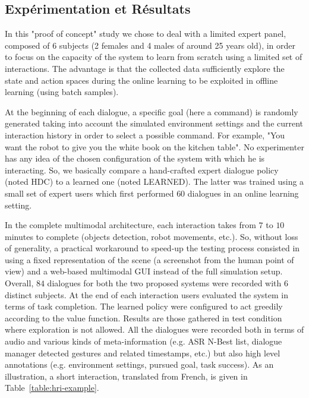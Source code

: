 \documentclass[a4paper,11pt,twoside]{StyleThese}
\begin{document}
\subsection{Expérimentation et Résultats}
In this "proof of concept" study we chose to deal with a limited expert panel, composed of 6 subjects (2 females and 4 males of around 25 years old), in order to focus on the capacity of the system to learn from scratch using a limited set of interactions. The advantage is that the collected data sufficiently explore the state and action spaces during the online learning to be exploited in offline learning (using batch samples).

At the beginning of each dialogue, a specific goal (here a command) is randomly generated taking into account the simulated environment settings and the current interaction history in order to select a possible command. For example, "You want the robot to give you the white book on the kitchen table". No experimenter has any idea of the chosen configuration of the system with which he is interacting. So, we basically compare a hand-crafted expert dialogue policy (noted HDC) to a learned one (noted LEARNED). The latter was trained using a small set of expert users which first performed $60$ dialogues in an online learning setting.

In the complete multimodal architecture, each interaction takes from $7$ to $10$ minutes to complete (objects detection, robot movements, etc.).  So, without loss of generality, a practical workaround to speed-up the testing process consisted in using a fixed representation of the scene (a screenshot from the human point of view) and a web-based multimodal GUI instead of the full simulation setup.  Overall, $84$ dialogues for both the two proposed systems were recorded with $6$ distinct subjects. At the end of each interaction users evaluated the system in terms of task completion. The learned policy were configured to act greedily according to the value function. Results are those gathered in test condition where exploration is not allowed. All the dialogues were  recorded both in terms of audio and various kinds of meta-information (e.g. ASR N-Best list, dialogue manager detected gestures and related timestamps, etc.) but also high level annotations (e.g. environment settings, pursued goal, task success). As an illustration, a short interaction, translated from French, is given in Table~\ref{table:hri-example}.
\end{document}
